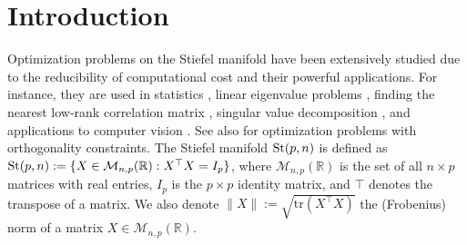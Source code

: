 \documentclass[11pt,reqno]{amsart}
\numberwithin{figure}{section}
\newcommand{\St}{  {\textup{St}}(p,n) }
\begin{document}
\makeatletter
{}
\makeatother




\date{\today}

\maketitle





\section{Introduction}
\setcounter{equation}{0}




Optimization problems on the Stiefel manifold \cite{C-M,J-D,Wang-Y,Zhu} have been extensively studied due to the reducibility of computational cost and their powerful applications. For instance, they are used in statistics \cite{C-V}, linear eigenvalue problems \cite{G-V,W-Y-L-Z}, finding the nearest low-rank correlation matrix \cite{L-Q}, singular value decomposition \cite{L-W-Z,S-I}, and applications to computer vision \cite{Lui,T-V-S-C}. See also \cite{E-A-S,S-S,W-Y} for optimization problems with orthogonality constraints. The Stiefel manifold $\St$ \cite{Stiefel} is defined as $\St := \{X \in \mathcal{M}_{n,p}(\mathbb{R}): X^\top X = I_p\}$, where $\mathcal{M}_{n,p}(\mathbb{R})$ is the set of all $n \times p$ matrices with real entries, $I_p$ is the $p \times p$ identity matrix, and $\top$ denotes the transpose of a matrix. We also denote $\|X\| := \sqrt{\text{tr}(X^\top X)}$  the (Frobenius) norm of a matrix $X \in \mathcal{M}_{n,p}(\mathbb{R})$.  
\end{document}
